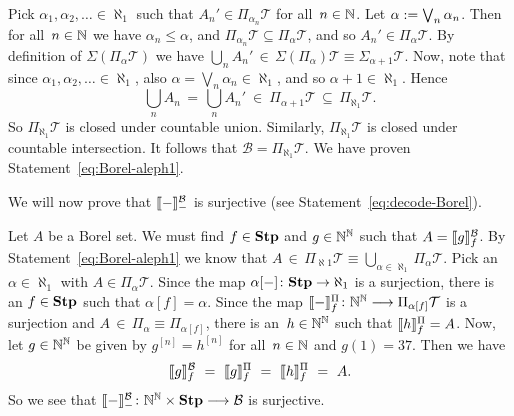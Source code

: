 \documentclass[main.tex]{subfiles}
\begin{document}
Pick $\alpha_1,\alpha_2,\dotsc \in \aleph_1$
such that $A_n' \in \Pi_{\alpha_n} \mathcal{T}$
for all~$n\in\mathbb{N}$.
Let $\alpha:= \bigvee_n \alpha_n$.
Then 
for all~$n\in\mathbb{N}$ we have $\alpha_n \leq \alpha$,
and  $\Pi_{\alpha_n} \mathcal{T} \subseteq \Pi_{\alpha}\mathcal{T}$,
and so $A_n'\in\Pi_{\alpha}\mathcal{T}$.
By definition of 
$ \Sigma(\Pi_{\alpha}\mathcal{T})$
we have $\bigcup_n A_n' \,\in\,
\Sigma(\Pi_{\alpha})\mathcal{T}\equiv\Sigma_{\alpha+1}\mathcal{T}$.
Now, note that since $\alpha_1,\alpha_2,\dotsc \in\aleph_1$,
also $\alpha=\bigvee_n \alpha_n \in \aleph_1$,
and so $\alpha+1 \in\aleph_1$.
Hence 
\begin{equation*}
\textstyle{\bigcup_n A_n \,=\,  \bigcup_n A_n' 
\ \in\  \Pi_{\alpha+1}\mathcal{T}
\,\subseteq\, \Pi_{\aleph_1}\mathcal{T}.}
\end{equation*}
So $\Pi_{\aleph_1} \mathcal{T}$
is closed under countable union.
Similarly, $\Pi_{\aleph_1} \mathcal{T}$
is closed under countable intersection.
It follows that  $\mathcal{B} = \Pi_{\aleph_1}\mathcal{T}$.
We have proven Statement~\eqref{eq:Borel-aleph1}.

We will now prove that $\decode{-}^{\mathcal{B}}_{-}$
is surjective
(see Statement~\eqref{eq:decode-Borel}).

Let $A$ be a Borel set.
We must find $f\in\mathbf{Stp}$
and $g\in\mathbb{N}^{\mathbb{N}}$ such that $A=\decode{g}^{\mathcal{B}}_f$.
By Statement~\eqref{eq:Borel-aleph1}
we know that $A\,\in\,\Pi_{\aleph1} \mathcal{T}
\equiv \bigcup_{\alpha\in\aleph_1} \Pi_\alpha\mathcal{T}$.
Pick an~$\alpha\in \aleph_1$ with $A\in \Pi_\alpha \mathcal{T}$.
Since the map $\alpha[-]\colon \mathbf{Stp} \rightarrow \aleph_1$
is a surjection,
there is an $f\in\mathbf{Stp}$
such that $\alpha[f] = \alpha$.
Since the map $\decode{-}^{\Pi}_{f}
\colon \N^\N \longrightarrow \Pi_{\alpha[f]} \mathcal{T}$
is a surjection
and $A\,\in\, \Pi_{\alpha} \equiv \Pi_{\alpha[f]}$,
there is an~$h\in \mathbb{N}^{\mathbb{N}}$
such that $\decode{h}^{\Pi}_f = A$.
Now, let $g\in\mathbb{N}^{\mathbb{N}}$ be given by
$g^{[n]} = h^{[n]}$ for all~$n\in\mathbb{N}$
and $g(1)= 37$.
Then we have
\begin{equation*}
\decode{g}^{\mathcal{B}}_f
\ =\ 
\decode{g}^{\Pi}_f
\ =\ 
\decode{h}^{\Pi}_f
\ =\ 
A.
\end{equation*}
So we see that $\decode{-}^{\mathcal{B}}_{-}
\colon \N^\N\times\Stump\longrightarrow \mathcal{B}$
is surjective.
\end{document}
